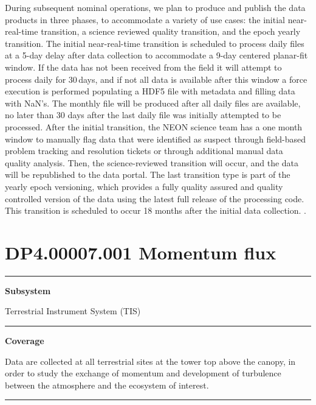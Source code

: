 \documentclass[]{article}
\begin{document}
During subsequent nominal operations, we plan to produce and publish the
data products in three phases, to accommodate a variety of use cases:
the initial near-real-time transition, a science reviewed quality
transition, and the epoch yearly transition. The initial near-real-time
transition is scheduled to process daily files at a 5-day delay after
data collection to accommodate a 9-day centered planar-fit window. If
the data has not been received from the field it will attempt to process
daily for 30\,days, and if not all data is available after this window a
force execution is performed populating a HDF5 file with metadata and
filling data with NaN's. The monthly file will be produced after all
daily files are available, no later than 30 days after the last daily
file was initially attempted to be processed. After the initial
transition, the NEON science team has a one month window to manually
flag data that were identified as suspect through field-based problem
tracking and resolution tickets or through additional manual data
quality analysis. Then, the science-reviewed transition will occur, and
the data will be republished to the data portal. The last transition
type is part of the yearly epoch versioning, which provides a fully
quality assured and quality controlled version of the data using the
latest full release of the processing code. This transition is scheduled
to occur 18 months after the initial data collection. \newpage
.

\section{DP4.00007.001 Momentum flux}\label{dp4.00007.001-momentum-flux}

\begin{center}\rule{0.5\linewidth}{\linethickness}\end{center}

\textbf{Subsystem}

Terrestrial Instrument System (TIS)

\begin{center}\rule{0.5\linewidth}{\linethickness}\end{center}

\textbf{Coverage}

Data are collected at all terrestrial sites at the tower top above the
canopy, in order to study the exchange of momentum and development of
turbulence between the atmosphere and the ecosystem of interest.

\begin{center}\rule{0.5\linewidth}{\linethickness}\end{center}
\end{document}
